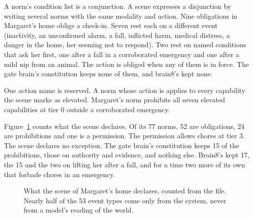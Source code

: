 A norm's condition list is a conjunction. A scene expresses a disjunction by writing several norms
with the same modality and action. Nine obligations in Margaret's home oblige a check-in. Seven
rest each on a different event (inactivity, an unconfirmed alarm, a fall, inflicted harm, medical
distress, a danger in the home, her seeming not to respond). Two rest on named conditions that ask
her first, one after a fall in a corroborated emergency and one after a mild nip from an animal.
The action is obliged when any of them is in force. The gate brain's constitution keeps none of
them, and brain8's kept none.

One action name is reserved. A norm whose action is  applies to every
capability the scene marks as elevated. Margaret's norm  prohibits all seven elevated
capabilities at tier 0 outside a corroborated emergency.

Figure~\ref{fig:erisml-census} counts what the scene declares. Of its 77 norms, 52 are obligations,
24 are prohibitions and one is a permission. The permission allows chores at tier 3. The scene
declares no exception. The gate brain's constitution keeps 15 of the prohibitions, those on
authority and evidence, and nothing else. Brain8's kept 17, the 15 and the two on lifting her
after a fall, and for a time two more of its own that forbade chores in an emergency.

\begin{figure}[t]
\centering

\caption{What the scene of Margaret's home declares, counted from the file. Nearly half of the 53 event
types come only from the system, never from a model's reading of the world.}
\label{fig:erisml-census}
\end{figure}

